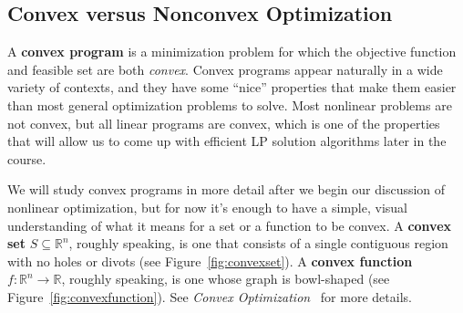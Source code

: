 \documentclass[11pt]{article}
\theoremstyle{definition} %
\begin{document}
\subsection{Convex versus Nonconvex Optimization}
\label{subsec:convex}

A \textbf{convex program} is a minimization problem for which the objective function and feasible set are both \textit{convex}. Convex programs appear naturally in a wide variety of contexts, and they have some ``nice'' properties that make them easier than most general optimization problems to solve. Most nonlinear problems are not convex, but all linear programs are convex, which is one of the properties that will allow us to come up with efficient LP solution algorithms later in the course.

We will study convex programs in more detail after we begin our discussion of nonlinear optimization, but for now it's enough to have a simple, visual understanding of what it means for a set or a function to be convex. A \textbf{convex set} $S \subseteq \mathbb{R}^n$, roughly speaking, is one that consists of a single contiguous region with no holes or divots (see Figure~\ref{fig:convexset}). A \textbf{convex function} $f : \mathbb{R}^n \to \mathbb{R}$, roughly speaking, is one whose graph is bowl-shaped (see Figure~\ref{fig:convexfunction}). See \textit{Convex Optimization}~\cite{boyd} for more details.
\end{document}

